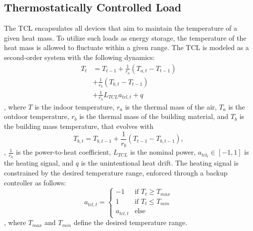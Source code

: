 \subsection{Thermostatically Controlled Load}\label{ssec:tcl}
The TCL encapsulates all devices that aim to maintain the temperature of a given heat mass. To utilize such loads as energy storage, the temperature of the heat mass is allowed to fluctuate within a given range. The TCL is modeled as a second-order system \cite{Sonderegger.1978} with the following dynamics:
\begin{equation}
    \begin{split}
        T_t &= T_{t-1} + \frac{1}{r_a} (T_{a, t} - T_{t-1}) \\
        &+ \frac{1}{r_b} (T_{b,t} - T_{t-1}) \\
        &+ \frac{1}{r_h} L_{TCL} a_{tcl,t} + q
    \end{split}
\end{equation},
where $T$ is the indoor temperature, $r_a$ is the thermal mass of the air, $T_{a}$ is the outdoor temperature, $r_b$ is the thermal mass of the building material, and $T_{b}$ is the  building mass temperature, that evolves with
\begin{equation}
    T_{b, t} = T_{b, t-1} + \frac{1}{r_b} (T_{t-1} - T_{b, t-1}),
\end{equation},
$\frac{1}{r_h}$ is the power-to-heat coefficient, $L_{TCL}$ is the nominal power, 
$a_{tcl_t} \in [-1, 1]$ is the heating signal, and $q$ is the unintentional heat drift. The heating signal is constrained by the desired temperature range, enforced through a backup controller as follows:
\begin{equation}
    a_{tcl, t} = \begin{cases}
        -1 & \text{if } T_t \geq T_{max} \\
        1 & \text{if } T_t \leq T_{min} \\
        a_{tcl, t} & \text{else} 
    \end{cases}
\end{equation},
where $T_{max}$ and $T_{min}$ define the desired temperature range. 

